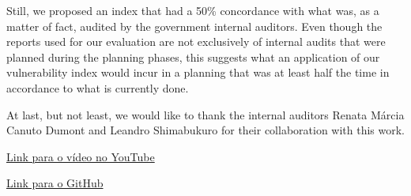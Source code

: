 \documentclass[conference]{IEEEtran}
\begin{document}
Still, we proposed an index that had a 50\% concordance with what was, as a matter of fact, audited by the government internal auditors. Even though the reports used for our evaluation are not exclusively of internal audits that were planned during the planning phases, this suggests what an application of our vulnerability index would incur in a planning that was at least half the time in accordance to what is currently done.

At last, but not least, we would like to thank the internal auditors Renata Márcia Canuto Dumont and Leandro Shimabukuro for their collaboration with this work.

\newpage
\printbibliography
\nocite{*}


\clearpage 
\appendix

\href{https://www.youtube.com/watch?v=5Os2YI8jTr8&ab_channel=EnnioFerreira}{Link para o vídeo no YouTube}

\href{https://github.com/ennioferreirab/case-study-prioritization}{Link para o GitHub}
\end{document}
